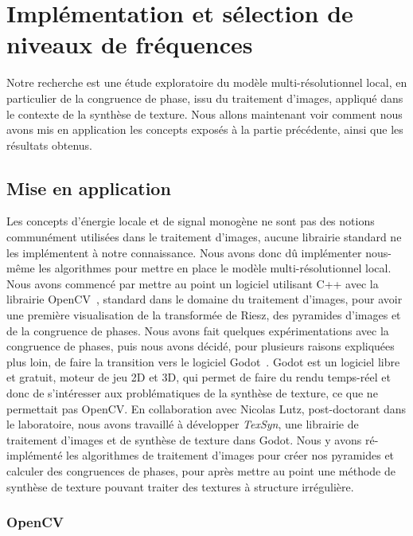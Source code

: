 \chapter{Implémentation et sélection de niveaux de fréquences}
\label{chap:chapitre2}

Notre recherche est une étude exploratoire du modèle multi-résolutionnel local, en particulier de la congruence de phase, issu du traitement d'images, appliqué dans le contexte de la synthèse de texture. Nous allons maintenant voir comment nous avons mis en application les concepts exposés à la partie précédente, ainsi que les résultats obtenus.

\section{Mise en application}

Les concepts d'énergie locale et de signal monogène ne sont pas des notions communément utilisées dans le traitement d'images, aucune librairie standard ne les implémentent à notre connaissance. Nous avons donc dû implémenter nous-même les algorithmes pour mettre en place le modèle multi-résolutionnel local. Nous avons commencé par mettre au point un logiciel utilisant C++ avec la librairie OpenCV~\cite{opencv_library}, standard dans le domaine du traitement d'images, pour avoir une première visualisation de la transformée de Riesz, des pyramides d'images et de la congruence de phases. Nous avons fait quelques expérimentations avec la congruence de phases, puis nous avons décidé, pour plusieurs raisons expliquées plus loin, de faire la transition vers le logiciel Godot~\cite{godot_game_engine}. Godot est un logiciel libre et gratuit, moteur de jeu 2D et 3D, qui permet de faire du rendu temps-réel et donc de s'intéresser aux problématiques de la synthèse de texture, ce que ne permettait pas OpenCV. En collaboration avec Nicolas Lutz, post-doctorant dans le laboratoire, nous avons travaillé à développer \textit{TexSyn}, une librairie de traitement d'images et de synthèse de texture dans Godot. Nous y avons ré-implémenté les algorithmes de traitement d'images pour créer nos pyramides et calculer des congruences de phases, pour après mettre au point une méthode de synthèse de texture pouvant traiter des textures à structure irrégulière.

\subsection{OpenCV}

